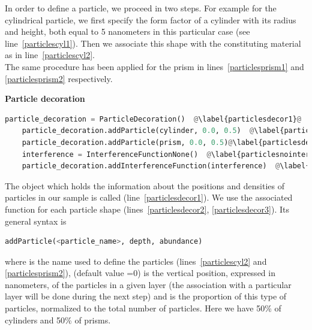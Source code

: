  
\noindent In order to define a particle, we proceed in two steps. For example for
the cylindrical particle, we first specify the form factor of a cylinder with 
its radius and height, both equal to 5 nanometers in this particular
case (see line~\ref{particlescyl1}). Then we associate this shape with
the constituting material as in line~\ref{particlescyl2}.\\

\noindent The same procedure has been applied for the prism in lines~\ref{particlesprism1} and \ref{particlesprism2} respectively.

\noindent \textbf{Particle decoration} \\
  

\begin{lstlisting}[language=python, style=eclipseboxed, name=ex1,nolol]
    particle_decoration = ParticleDecoration()  @\label{particlesdecor1}@
    particle_decoration.addParticle(cylinder, 0.0, 0.5)  @\label{particlesdecor2}@
    particle_decoration.addParticle(prism, 0.0, 0.5)@\label{particlesdecor3}@
    interference = InterferenceFunctionNone()  @\label{particlesnointerf}@
    particle_decoration.addInterferenceFunction(interference)  @\label{particlesinterf}@
\end{lstlisting}

\noindent The object which holds the information about the positions and densities of particles
in our sample is called 
(line~\ref{particlesdecor1}). We use the associated function 
for each particle shape (lines~\ref{particlesdecor2}, \ref{particlesdecor3}). Its general
syntax is 

\begin{lstlisting}[language=python, style=eclipse,numbers=none]
addParticle(<particle_name>, depth, abundance) 
\end{lstlisting}

\noindent  where  is the name used to define the particles
(lines~\ref{particlescyl2} and \ref{particlesprism2}), 
(default value =0)
is the vertical position, expressed in nanometers, of the particles in a given layer (the
association with a particular layer will be done during the next step) and
 is the proportion of this type of particles, 
normalized to the total number of particles. Here we have 50\% of cylinders
and 50\% of prisms. \\ 

